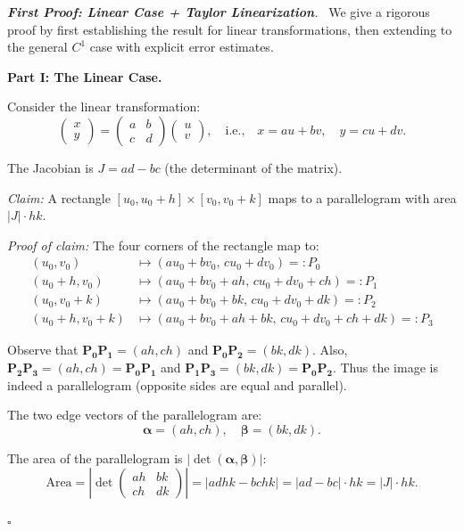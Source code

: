 \documentclass[11pt]{report}
\renewenvironment{proof}[1][Proof]{\par\noindent\textit{#1.}\ }{\hfill$\square$\par\medskip}
\begin{document}
\begin{proof}[\textbf{First Proof: Linear Case + Taylor Linearization}]
We give a rigorous proof by first establishing the result for linear transformations, then extending to the general $C^1$ case with explicit error estimates.

\textbf{Part I: The Linear Case.}

Consider the linear transformation:
\[
\begin{pmatrix} x \\ y \end{pmatrix} = \begin{pmatrix} a & b \\ c & d \end{pmatrix} \begin{pmatrix} u \\ v \end{pmatrix}, \quad \text{i.e.,} \quad x = au + bv, \quad y = cu + dv.
\]

The Jacobian is $J = ad - bc$ (the determinant of the matrix).

\textit{Claim:} A rectangle $[u_0, u_0 + h] \times [v_0, v_0 + k]$ maps to a parallelogram with area $|J| \cdot hk$.

\textit{Proof of claim:} The four corners of the rectangle map to:
\begin{align*}
(u_0, v_0) &\mapsto (au_0 + bv_0, \, cu_0 + dv_0) =: P_0 \\
(u_0 + h, v_0) &\mapsto (au_0 + bv_0 + ah, \, cu_0 + dv_0 + ch) =: P_1 \\
(u_0, v_0 + k) &\mapsto (au_0 + bv_0 + bk, \, cu_0 + dv_0 + dk) =: P_2 \\
(u_0 + h, v_0 + k) &\mapsto (au_0 + bv_0 + ah + bk, \, cu_0 + dv_0 + ch + dk) =: P_3
\end{align*}

Observe that $\mathbf{P_0 P_1} = (ah, ch)$ and $\mathbf{P_0 P_2} = (bk, dk)$. Also, $\mathbf{P_2 P_3} = (ah, ch) = \mathbf{P_0 P_1}$ and $\mathbf{P_1 P_3} = (bk, dk) = \mathbf{P_0 P_2}$. Thus the image is indeed a parallelogram (opposite sides are equal and parallel).

The two edge vectors of the parallelogram are:
\[
\boldsymbol{\alpha} = (ah, ch), \quad \boldsymbol{\beta} = (bk, dk).
\]

The area of the parallelogram is $|\det(\boldsymbol{\alpha}, \boldsymbol{\beta})|$:
\[
\text{Area} = \left| \det \begin{pmatrix} ah & bk \\ ch & dk \end{pmatrix} \right| = |adhk - bchk| = |ad - bc| \cdot hk = |J| \cdot hk.
\]


\end{proof}
\end{document}
